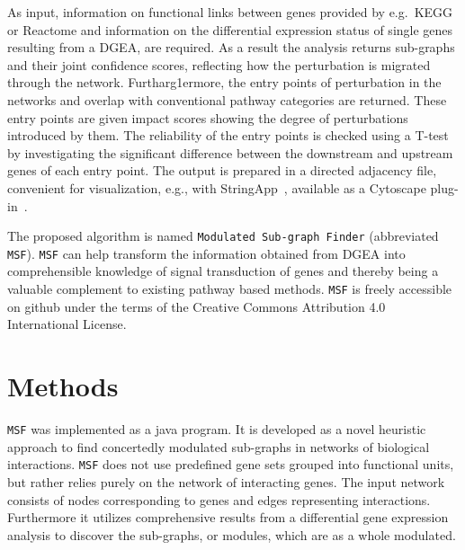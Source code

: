 \documentclass[10pt,a4paper,twocolumn]{article}
\begin{document}
	As input, information on functional links between genes provided by
	e.g.~KEGG or Reactome and information on the differential expression status
	of single genes resulting from a DGEA, are required. As a result the
	analysis returns sub-graphs and their joint confidence scores, reflecting
	how the perturbation is migrated through the network. Furtharg1ermore, the
	entry points of perturbation in the networks and overlap with conventional
	pathway categories are returned. These entry points are given impact scores showing the degree of perturbations introduced by them. The reliability of the entry points is checked using a T-test by investigating the significant difference between the downstream and upstream genes of each entry point. The output is prepared in a directed
	adjacency file, convenient for visualization, e.g., with
	StringApp~\cite{StringApp}, available as a Cytoscape plug-in~\cite{Cyto}.
	
	The proposed algorithm is named
	\texttt{Modulated Sub-graph Finder} (abbreviated
	\texttt{MSF}). \texttt{MSF} can help transform the information obtained
	from DGEA into comprehensible knowledge of signal transduction of genes and
	thereby being a valuable complement to existing pathway based
	methods.  \texttt{MSF} is freely accessible on github under the terms of the
	Creative Commons Attribution 4.0 International License.
	
	
	
	
	\section*{Methods}
	
	\texttt{MSF} was implemented as a java program. It is developed as a novel heuristic approach to find concertedly
	modulated sub-graphs in networks of biological interactions.  \texttt{MSF}
	does not use predefined gene sets grouped into functional units, but rather
	relies purely on the network of interacting genes. The input network
	consists of nodes corresponding to genes and edges representing
	interactions. Furthermore it utilizes comprehensive results from a
	differential gene expression analysis to discover the sub-graphs, or
	modules, which are as a whole modulated.
	
\end{document}
